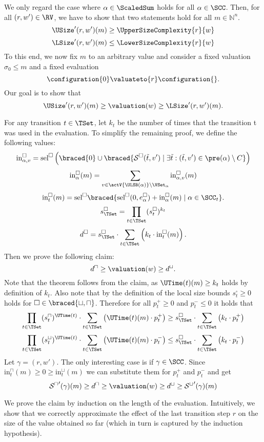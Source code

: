 We only regard the case where $\alpha \in \ScaledSum$ holds for all $\alpha \in \SCC$.
Then, for all $(r, w') \in \RV$, we have to show that two statements hold for all $m \in \mathbb{N}^n$.
\[ \USize'(r, w')(m) \geq \UpperSizeComplexity{r}{w} \]
\[ \LSize'(r, w')(m) \leq \LowerSizeComplexity{r}{w} \]
To this end, we now fix $m$ to an arbitrary value and consider a fixed valuation $\sigma_0 \leq m$ and a fixed evaluation
\[ \configuration{0} \valuateto{r} \configuration{}. \]
Our goal is to show that
\[ \USize'(r, w')(m) \geq \valuation(w) \geq \LSize'(r, w')(m). \]

For any transition $t \in \TSet$, let $k_t$ be the number of times that the transition t was used in the evaluation.
To simplify the remaining proof, we define the following values:
\[ \text{in}^\square_{\alpha,v} = \text{sel}^\square \left( \braced{0} \cup \braced{\mathcal{S}^\square(\tilde{t}, v') \mid \exists \tilde{t}: (\tilde{t}, v') \in \pre(\alpha) \setminus C} \right) \]
\[ \text{in}^\square_\alpha(m) = \sum_{v \in \actV{\ULSB(\alpha)} \setminus \VSet_\alpha} \text{in}^\square_{\alpha,v}(m) \]
\[ \text{in}^\square_t(m) = \text{sel}^\square \braced{\text{sel}^\square(0, e^{\square}_\alpha) + \text{in}^\square_\alpha(m) \mid \alpha \in \SCC_t }. \]
\[ s^\square_\TSet = \prod_{t \in \TSet} (s^\square_t)^{k_t} \]
\[ d^\square = s^\square_\TSet \cdot \sum_{t \in \TSet} \left( k_t \cdot \text{in}^\square_t(m) \right). \]
Then we prove the following claim:
\[ d^\sqcap \geq \valuation(w) \geq d^\sqcup. \]
Note that the theorem follows from the claim, as $\UTime(t)(m) \geq k_t$ holds by definition of $k_t$.
Also note that by the definition of the local size bounds $s^\square_t \geq 0$ holds for $\square \in \braced{\sqcup, \sqcap}$.
Therefore for all $p^+_t \geq 0$ and $p^-_t \leq 0$ it holds that
\[ \prod_{t \in \TSet} (s^\sqcap_t)^{\UTime(t)} \cdot \sum_{t \in \TSet} \left( \UTime(t)(m) \cdot p^+_t \right) \geq s^\square_\TSet \cdot \sum_{t \in \TSet} \left( k_t \cdot p^+_t \right) \]
\[ \prod_{t \in \TSet} (s^\sqcup_t)^{\UTime(t)} \cdot \sum_{t \in \TSet} \left( \UTime(t)(m) \cdot p^-_t \right) \leq s^\square_\TSet \cdot \sum_{t \in \TSet} \left( k_t \cdot p^-_t \right) \]
Let $\gamma = (r, w')$.
The only interesting case is if $\gamma \in \SCC$.
Since $\text{in}^\sqcap_t(m) \geq 0 \geq \text{in}^\sqcup_t(m)$ we can substitute them for $p^+_t$ and $p^-_t$ and get
\[ {\mathcal{S}^\sqcap}'(\gamma)(m) \geq d^\sqcap \geq \valuation(w) \geq d^\sqcup \geq {\mathcal{S}^\sqcup}'(\gamma)(m) \]

We prove the claim by induction on the length of the evaluation.
Intuitively, we show that we correctly approximate the effect of the last transition step $r$ on the size of the value obtained so far (which in turn is captured by the induction hypothesis).

